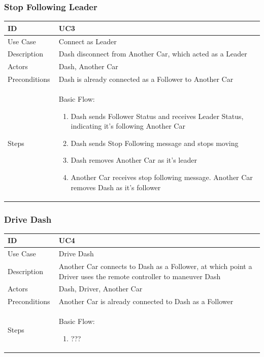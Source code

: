\documentclass[12pt]{article}
\begin{document}
\subsubsection{Stop Following Leader}
\begin{longtable}{| p{0.2\linewidth} | p{0.8\linewidth} |}\hline 
    ID & UC3\\ \hline
    Use Case & Connect as Leader\\ \hline
    Description & Dash disconnect from Another Car, which acted as a Leader\\ \hline
    Actors & Dash, Another Car\\ \hline
    Preconditions & Dash is already connected as a Follower to Another Car\\ \hline
    Steps & Basic Flow: \begin{enumerate} %
        \itemsep 0em %
    	\item Dash sends Follower Status and receives Leader Status, indicating it’s following Another Car
		\item Dash sends Stop Following message and stops moving
        \item Dash removes Another Car as it’s leader
        \item Another Car receives stop following message. Another Car removes Dash as it’s follower
	\end{enumerate}\\ \hline
\end{longtable}

\subsubsection{Drive Dash}
\begin{longtable}{| p{0.2\linewidth} | p{0.8\linewidth} |}\hline 
    ID & UC4\\ \hline
    Use Case & Drive Dash\\ \hline
    Description & Another Car connects to Dash as a Follower, at which point a Driver uses the remote controller to maneuver Dash\\ \hline
    Actors & Dash, Driver, Another Car\\ \hline
    Preconditions & Another Car is already connected to Dash as a Follower\\ \hline
    Steps & Basic Flow: \begin{enumerate} %
        \itemsep 0em %
    	\item ???
	\end{enumerate}\\ \hline
\end{longtable}
\end{document}
